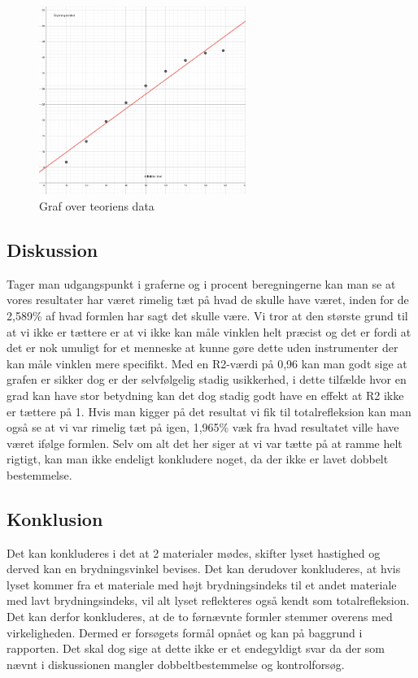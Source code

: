 \begin{figure}[htbp]
    \centering
    \includegraphics[width=0.6\textwidth]{figures/brydningsvinkelteorigraf2.png}
    \caption{Graf over teoriens data}
\end{figure}
\newpage

\subsection{Diskussion}
Tager man udgangspunkt i graferne og i procent beregningerne kan man se at vores resultater har været rimelig tæt på hvad de skulle have været, inden for de 2,589\% af hvad formlen har sagt det skulle være. Vi tror at den største grund til at vi ikke er tættere er at vi ikke kan måle vinklen helt præcist og det er fordi at det er nok umuligt for et menneske at kunne gøre dette uden instrumenter der kan måle vinklen mere specifikt. Med en R2-værdi på 0,96 kan man godt sige at grafen er sikker dog er der selvfølgelig stadig usikkerhed, i dette tilfælde hvor en grad kan have stor betydning kan det dog stadig godt have en effekt at R2  ikke er tættere på 1. Hvis man kigger på det resultat vi fik til totalrefleksion kan man også se at vi var rimelig tæt på igen, 1,965\% væk fra hvad resultatet ville have været ifølge formlen. Selv om alt det her siger at vi var tætte på at ramme helt rigtigt, kan man ikke endeligt konkludere noget, da der ikke er lavet dobbelt bestemmelse.

\subsection{Konklusion}
Det kan konkluderes i det at 2 materialer mødes, skifter lyset hastighed og derved kan en brydningsvinkel bevises. Det kan derudover konkluderes, at hvis lyset kommer fra et materiale med højt brydningsindeks til et andet materiale med lavt brydningsindeks, vil alt lyset reflekteres også kendt som totalrefleksion. Det kan derfor konkluderes, at de to førnævnte formler stemmer overens med virkeligheden. Dermed er forsøgets formål opnået og kan på baggrund i rapporten. Det skal dog sige at dette ikke er et endegyldigt svar da der som nævnt i diskussionen mangler dobbeltbestemmelse og kontrolforsøg. 